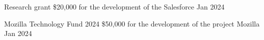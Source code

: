 

\begin{cvhonors}

  \cvhonor
    {Research grant} %
    {\$20,000 for the development of the \href{https://ml.energy}{}} %
    {Salesforce} %
    {Jan 2024} %

  \cvhonor
    {Mozilla Technology Fund 2024} %
    {\$50,000 for the development of the \href{https://ml.energy/zeus}{} project} %
    {Mozilla} %
    {Jan 2024} %

\end{cvhonors}
